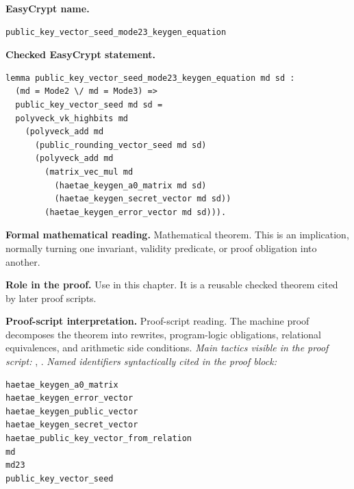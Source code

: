 \begin{formaltheorem}
\noindent\textbf{EasyCrypt name.}
\begin{lstlisting}[language=EasyCrypt,basicstyle=\ttfamily\scriptsize]
public_key_vector_seed_mode23_keygen_equation
\end{lstlisting}
\noindent\textbf{Checked EasyCrypt statement.}
\begin{lstlisting}[language=EasyCrypt,basicstyle=\ttfamily\scriptsize]
lemma public_key_vector_seed_mode23_keygen_equation md sd :
  (md = Mode2 \/ md = Mode3) =>
  public_key_vector_seed md sd =
  polyveck_vk_highbits md
    (polyveck_add md
      (public_rounding_vector_seed md sd)
      (polyveck_add md
        (matrix_vec_mul md
          (haetae_keygen_a0_matrix md sd)
          (haetae_keygen_secret_vector md sd))
        (haetae_keygen_error_vector md sd))).
\end{lstlisting}
\noindent\textbf{Formal mathematical reading.}
Mathematical theorem. This is an implication, normally turning one invariant, validity predicate, or proof obligation into another.

\noindent\textbf{Role in the proof.}
Use in this chapter. It is a reusable checked theorem cited by later proof scripts.

\noindent\textbf{Proof-script interpretation.}
Proof-script reading. The machine proof decomposes the theorem into rewrites, program-logic obligations, relational equivalences, and arithmetic side conditions.
\emph{Main tactics visible in the proof script:} , .
\emph{Named identifiers syntactically cited in the proof block:}
\begin{lstlisting}[language=EasyCrypt,basicstyle=\ttfamily\scriptsize]
haetae_keygen_a0_matrix
haetae_keygen_error_vector
haetae_keygen_public_vector
haetae_keygen_secret_vector
haetae_public_key_vector_from_relation
md
md23
public_key_vector_seed
\end{lstlisting}

\end{formaltheorem}

